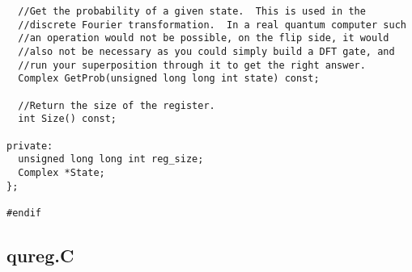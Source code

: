 \documentclass[]{article}
\begin{document}
\begin{verbatim}
  //Get the probability of a given state.  This is used in the
  //discrete Fourier transformation.  In a real quantum computer such
  //an operation would not be possible, on the flip side, it would
  //also not be necessary as you could simply build a DFT gate, and
  //run your superposition through it to get the right answer.
  Complex GetProb(unsigned long long int state) const;

  //Return the size of the register.
  int Size() const;

private:
  unsigned long long int reg_size;
  Complex *State;
};

#endif
\end{verbatim}

\subsection{qureg.C}
\end{document}
